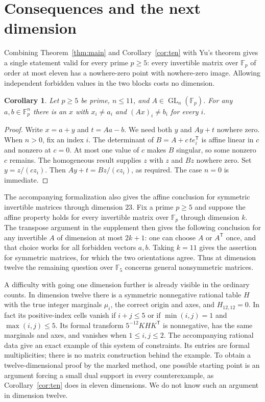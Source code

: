 \documentclass[11pt]{article}
\newtheorem{corollary}[theorem]{Corollary}
\theoremstyle{definition}\newtheorem{definition}[theorem]{Definition}
\theoremstyle{remark}\newtheorem{remark}[theorem]{Remark}
\newcommand{\F}{\mathbb F_5}
\DeclareMathOperator{\GL}{GL}
\begin{document}
\section{Consequences and the next dimension}
Combining Theorem~\ref{thm:main} and Corollary~\ref{cor:ten} with Yu's theorem gives a single statement valid for every prime $p\ge5$: every invertible matrix over $\mathbb F_p$ of order at most eleven has a nowhere-zero point with nowhere-zero image. Allowing independent forbidden values in the two blocks costs no dimension.

\begin{corollary}\label{cor:affine}
Let $p\ge5$ be prime, $n\le11$, and $A\in\GL_n(\mathbb F_p)$. For any $a,b\in\mathbb F_p^n$ there is an $x$ with $x_i\ne a_i$ and $(Ax)_i\ne b_i$ for every $i$.
\end{corollary}
\begin{proof}
Write $x=a+y$ and $t=Aa-b$. We need both $y$ and $Ay+t$ nowhere zero. When $n>0$, fix an index $i$. The determinant of $B=A+c\,t e_i^{\mathsf T}$ is affine linear in $c$ and nonzero at $c=0$. At most one value of $c$ makes $B$ singular, so some nonzero $c$ remains. The homogeneous result supplies $z$ with $z$ and $Bz$ nowhere zero. Set $y=z/(c z_i)$. Then $Ay+t=Bz/(c z_i)$, as required. The case $n=0$ is immediate.
\end{proof}

The accompanying formalization also gives the affine conclusion for symmetric invertible matrices through dimension $23$. Fix a prime $p\ge5$ and suppose the affine property holds for every invertible matrix over $\mathbb F_p$ through dimension $k$. The transpose argument in the supplement then gives the following conclusion for any invertible $A$ of dimension at most $2k+1$: one can choose $A$ or $A^{\mathsf T}$ once, and that choice works for all forbidden vectors $a,b$. Taking $k=11$ gives the assertion for symmetric matrices, for which the two orientations agree. Thus at dimension twelve the remaining question over $\F$ concerns general nonsymmetric matrices.

A difficulty with going one dimension further is already visible in the ordinary counts. In dimension twelve there is a symmetric nonnegative rational table $H$ with the true integer marginals $\mu_i$, the correct origin and axes, and $H_{12,12}=0$. In fact its positive-index cells vanish if $i+j\le5$ or if $\min(i,j)=1$ and $\max(i,j)\le5$. Its formal transform $5^{-12}KHK^{\mathsf T}$ is nonnegative, has the same marginals and axes, and vanishes when $1\le i,j\le2$. The accompanying rational data give an exact example of this system of constraints. Its entries are formal multiplicities; there is no matrix construction behind the example. To obtain a twelve-dimensional proof by the marked method, one possible starting point is an argument forcing a small dual support in every counterexample, as Corollary~\ref{cor:ten} does in eleven dimensions. We do not know such an argument in dimension twelve.
\end{document}
